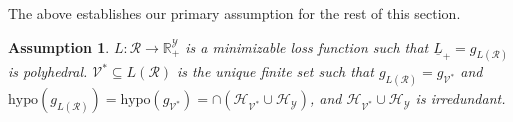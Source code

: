 \documentclass[11pt]{article}
\newcommand{\reals}{\mathbb{R}}
\renewcommand{\H}{\mathcal{H}}
\newcommand{\R}{\mathcal{R}}
\newcommand{\V}{\mathcal{V}}
\newcommand{\Y}{\mathcal{Y}}
\newcommand{\risk}[1]{\underline{#1}}
\newcommand{\hyp}{\mathrm{hypo}}
\newtheorem{corollary}{Corollary}
\newtheorem{assumption}{Assumption}
\begin{document}

%



The above establishes our primary assumption for the rest of this section.


\begin{assumption}\label{assum:V-star-exists-infinite}
	$L : \R \to \reals^\Y_+$ is a minimizable loss function such that $\risk L_+ = g_{L(\R)}$ is polyhedral.
	$\V^* \subseteq L(\R)$ is the unique finite set such that $g_{L(\R)} = g_{\V^*}$ and $\hyp(g_{L(\R)}) = \hyp(g_{\V^*}) = \cap(\H_{\V^*} \cup \H_\Y)$, and $\H_{\V^*} \cup \H_\Y$ is irredundant.
\end{assumption}
\end{document}
